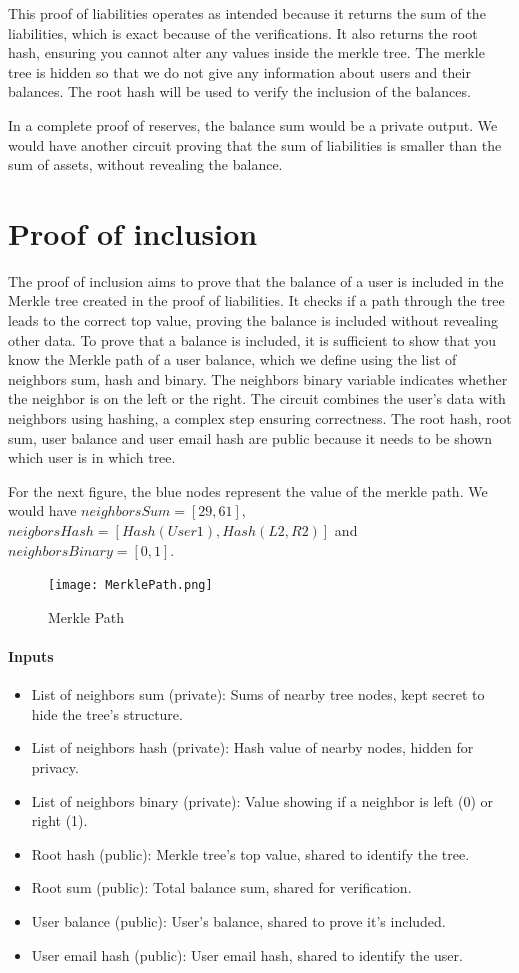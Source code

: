 This proof of liabilities operates as intended because it returns the sum of the liabilities, which is exact because of the verifications.
It also returns the root hash, ensuring you cannot alter any values inside the merkle tree. The merkle tree is hidden so that we do not
give any information about users and their balances.
The root hash will be used to verify the inclusion of the balances.

In a complete proof of reserves, the balance sum would be a private output. We would have another circuit proving that the sum of liabilities is smaller
than the sum of assets, without revealing the balance.

\section{Proof of inclusion}
\label{subsec:pi}
The proof of inclusion aims to prove that the balance of a user is included in the Merkle tree created in the proof of liabilities. 
It checks if a path through the tree leads to the correct top value, proving the balance is included without revealing other data.
To prove that a balance is included, it is sufficient to show that you know the Merkle path of a user balance,
which we define using the list of neighbors sum, hash and binary.
The neighbors binary variable indicates whether the neighbor is on the left or the right. The circuit combines the user's data with neighbors using hashing, a complex step ensuring correctness.
The root hash, root sum, user balance and user email hash are public because it needs to be shown which user is in which tree.

For the next figure, the blue nodes represent the value of the merkle path.
We would have $neighborsSum=[29,61]$, $neigborsHash=[Hash(User1),Hash(L2,R2)]$ and $neighborsBinary=[0,1]$.
   \begin{figure}[H]
   \centering
   \texttt{[image: MerklePath.png]}
   \caption{Merkle Path}
   \label{overflow}
   \end{figure}

\paragraph{Inputs}
\begin{itemize}
   \item List of neighbors sum (private): Sums of nearby tree nodes, kept secret to hide the tree's structure.
   \item List of neighbors hash (private): Hash value of nearby nodes, hidden for privacy.
   \item List of neighbors binary (private): Value showing if a neighbor is left (0) or right (1).
   \item Root hash (public): Merkle tree's top value, shared to identify the tree.
   \item Root sum (public): Total balance sum, shared for verification.
   \item User balance (public): User's balance, shared to prove it's included.
   \item User email hash (public): User email hash, shared to identify the user.
   \end{itemize}

